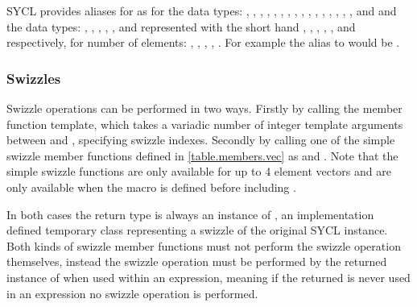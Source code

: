 SYCL provides aliases for  as  for the data types: , ,
, , , ,
, , , , , , ,
, , ,  and  and the data types: 
, , ,
, , 
and  represented with the short hand , , , , ,  and  respectively, for
number of elements: , , , , . For example \codeinline the alias to  would be .

\subsubsection{Swizzles}

Swizzle operations can be performed in two ways. Firstly by calling the  member function template, which takes a variadic number of integer template arguments between  and , specifying swizzle indexes. Secondly by calling one of the simple swizzle member functions defined in \ref{table.members.vec} as  and . Note that the simple swizzle functions are only available for up to 4 element vectors and are only available when the macro  is defined before including .

In both cases the return type is always an instance of , an implementation defined temporary class representing a swizzle of the original SYCL  instance. Both kinds of swizzle member functions must not perform the swizzle operation themselves, instead the swizzle operation must be performed by the returned instance of  when used within an expression, meaning if the returned  is never used in an expression no swizzle operation is performed.

